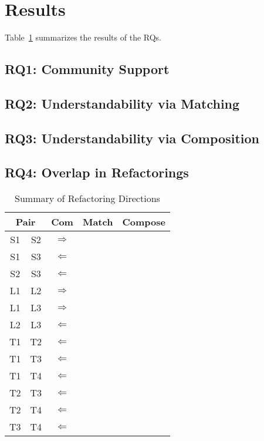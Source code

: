 
\section{Results}
\label{sec:results}
Table~\ref{summaryResults} summarizes the results of the RQs.  

\subsection{RQ1: Community Support}

\subsection{RQ2: Understandability via Matching}

\subsection{RQ3: Understandability via Composition}

\subsection{RQ4: Overlap in Refactorings}

\begin{table}
\caption{Summary of Refactoring Directions \label{summaryResults}}
\begin{center}
\begin{tabular}{|cc | c c c|} \hline
\multicolumn{2}{|c|}{\textbf{Pair}} & \textbf{Com} & \textbf{Match} & \textbf{Compose} \\ \hline \hline
S1 & S2 & $\Rightarrow$ & & \\
S1 & S3 & $\Leftarrow$ & & \\
S2 & S3 & $\Leftarrow$ & & \\
\hline 
L1 & L2 & $\Rightarrow$ & & \\
L1 & L3 & $\Rightarrow$ & & \\
L2 & L3 & $\Leftarrow$ & & \\
\hline
T1 & T2 & $\Leftarrow$  & & \\
T1 & T3 & $\Leftarrow$ & & \\
T1 & T4 & $\Leftarrow$ & & \\
T2 & T3 & $\Leftarrow$ & & \\
T2 & T4 & $\Leftarrow$ & & \\
T3 & T4 & $\Leftarrow$ & & \\
\hline


\end{tabular}
\end{center}
\end{table}



